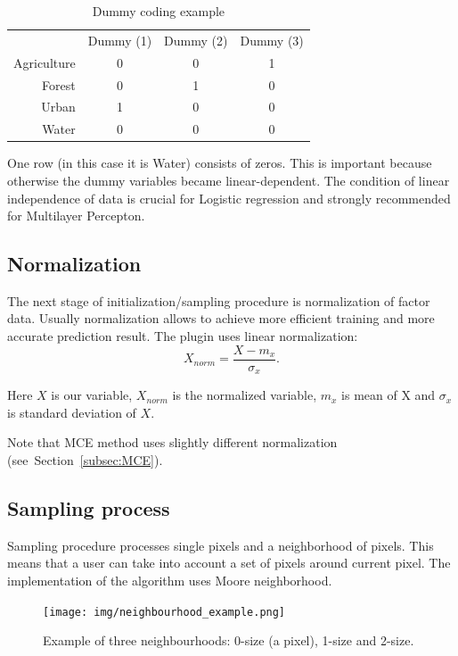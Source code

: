 \documentclass{report}
\begin{document}
\begin{table}[]
\centering
\caption{Dummy coding example}
\begin{tabular}{rccc}
           & Dummy (1) & Dummy (2) & Dummy (3) \\
Agriculture & 0    & 0         & 1  \\
Forest&  0        & 1        & 0  \\
Urban &  1         &   0      & 0 \\ 
Water &  0         & 0        & 0            
\end{tabular}
\label{tab:dummy_coding_example}
\end{table}

One row (in this case it is Water) consists of zeros.
This is important because otherwise the dummy variables became linear-dependent.
The condition of linear independence of data is crucial for Logistic regression and strongly recommended for Multilayer Percepton. 



\subsection{Normalization}\label{subsec:normalization}
The next stage of initialization/sampling procedure is normalization of factor data. Usually normalization allows to achieve more efficient training and more accurate prediction result. The plugin uses linear normalization:
$$
X_{norm} = \frac{X-m_x}{\sigma_x}.
$$

Here $X$ is our variable, $X_{norm}$ is the normalized variable, $m_{x}$ is mean of X and $\sigma _{x}$ is standard deviation of $X$. 

Note that MCE method uses slightly different normalization (see~Section~\ref{subsec:MCE}).


\subsection{Sampling process}\label{subsec:sampling}

Sampling procedure processes single pixels and a neighborhood of pixels.
This means that a user can take into account a set of pixels around current pixel.
The implementation of the algorithm uses Moore neighborhood.

\begin{figure}[h!]
\centering
\texttt{[image: img/neighbourhood\_example.png]}
\caption{Example of three neighbourhoods: 0-size (a pixel), 1-size and 2-size.}
\label{fig:neighbourhood_example}
\end{figure}
\end{document}
